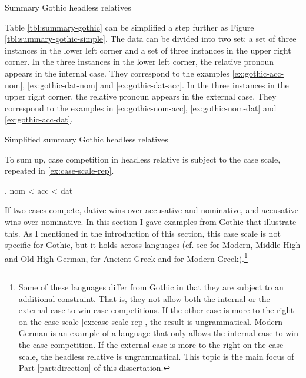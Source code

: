 \begin{table}[H]
  \center
  \caption{Summary Gothic headless relatives}
    
    \label{tbl:summary-gothic}
\end{table}

Table \ref{tbl:summary-gothic} can be simplified a step further as Figure \ref{tbl:summary-gothic-simple}. The data can be divided into two set: a set of three instances in the lower left corner and a set of three instances in the upper right corner.
In the three instances in the lower left corner, the relative pronoun appears in the internal case. They correspond to the examples \ref{ex:gothic-acc-nom}, \ref{ex:gothic-dat-nom} and \ref{ex:gothic-dat-acc}.
In the three instances in the upper right corner, the relative pronoun appears in the external case. They correspond to the examples in \ref{ex:gothic-nom-acc}, \ref{ex:gothic-nom-dat} and \ref{ex:gothic-acc-dat}.

\begin{table}[H]
  \center
  \caption{Simplified summary Gothic headless relatives}
    
    \label{tbl:summary-gothic-simple}
\end{table}

To sum up, case competition in headless relative is subject to the case scale, repeated in \ref{ex:case-scale-rep}.

\ex. \ac{nom} < \ac{acc} < \ac{dat}\label{ex:case-scale-rep}

If two cases compete, dative wins over accusative and nominative, and accusative wins over nominative. In this section I gave examples from Gothic that illustrate this. As I mentioned in the introduction of this section, this case scale is not specific for Gothic, but it holds across languages (cf. see \citealt{pittner1995} for Modern, Middle High and Old High German, \citealt{grosu2003} for Ancient Greek and \citealt{daskalaki2011} for Modern Greek).\footnote{
Some of these languages differ from Gothic in that they are subject to an additional constraint. That is, they not allow both the internal or the external case to win case competitions. If the other case is more to the right on the case scale \ref{ex:case-scale-rep}, the result is ungrammatical. Modern German is an example of a language that only allows the internal case to win the case competition. If the external case is more to the right on the case scale, the headless relative is ungrammatical.
This topic is the main focus of Part \ref{part:direction} of this dissertation.}

